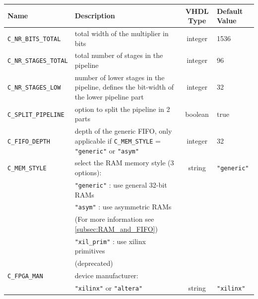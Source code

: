 \begin{center}
	\begin{tabular}{|l|p{6.5cm}|c|l|}
		\hline
		\rowcolor{Gray}
		\textbf{Name} & \textbf{Description} & \textbf{VHDL Type} &\textbf{Default Value} \bigstrut\\
		\hline
		\verb|C_NR_BITS_TOTAL| & total width of the multiplier in bits & integer & 1536\bigstrut\\
		\hline
		\verb|C_NR_STAGES_TOTAL| & total number of stages in the pipeline & integer & 96\bigstrut\\
		\hline
		\verb|C_NR_STAGES_LOW| & number of lower stages in the pipeline, defines the bit-width of the lower pipeline part & integer & 32 \bigstrut\\
		\hline
		\verb|C_SPLIT_PIPELINE| & option to split the pipeline in 2 parts & boolean & true \bigstrut\\
		\hline
		\verb|C_FIFO_DEPTH| & depth of the generic FIFO, only applicable if \verb|C_MEM_STYLE| = \verb|"generic"| or \verb|"asym"|  & integer & 32 \bigstrut\\
		\hline
		\verb|C_MEM_STYLE| & select the RAM memory style (3 options): & string & \verb|"generic"| \bigstrut\\
							& \verb|"generic"| : use general 32-bit RAMs & & \\
      						& \verb|"asym"| : use asymmetric RAMs & & \\
      						& (For more information see \ref{subsec:RAM_and_FIFO}) & & \\
      						& \verb|"xil_prim"| : use xilinx primitives & &\\
      						& (deprecated) & & \bigstrut[b] \\
		\hline
		\verb|C_FPGA_MAN| & device manufacturer: & & \\
						& \verb|"xilinx"| or \verb|"altera"| & string & \verb|"xilinx"| \bigstrut\\
		\hline
	\end{tabular}%
\end{center}

